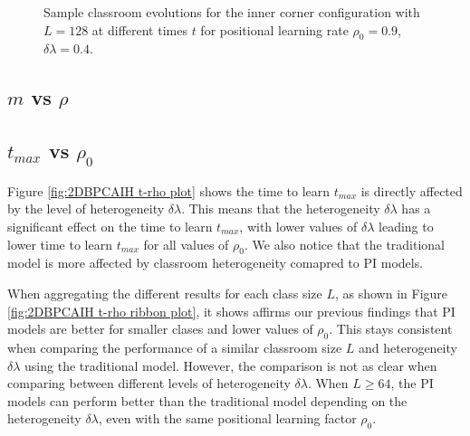\begin{figure}[htbp!]
    \label{fig:2DBPCAIH sample class evolution high rho high delta}
    \caption{Sample classroom evolutions for the inner corner configuration with $L=128$ at different times $t$ for positional learning rate $\rho_0=0.9$, $\delta\lambda = 0.4$.}
 \end{figure}

\subsection{$m$ vs $\rho$}\label{subsec:BPCAIH m vs rho}

\subsection{$t_{max}$ vs $\rho_0$}\label{subsec:BPCAIH t vs rho}
Figure \ref{fig:2DBPCAIH t-rho plot} shows the time to learn $t_{max}$ is directly affected by the level of heterogeneity $\delta\lambda$. 
This means that the heterogeneity $\delta\lambda$ has a significant effect on the time to learn $t_{max}$, with lower values of $\delta\lambda$ leading to lower time to learn $t_{max}$ for all values of $\rho_0$. 
We also notice that the traditional model is more affected by classroom heterogeneity comapred to PI models.

When aggregating the different results for each class size $L$, as shown in Figure \ref{fig:2DBPCAIH t-rho ribbon plot}, it shows affirms our previous findings that PI models are better for smaller clases and lower values of $\rho_0$.
This stays consistent when comparing the performance of a similar classroom size $L$ and heterogeneity $\delta\lambda$ using the traditional model.
However, the comparison is not as clear when comparing between different levels of heterogeneity $\delta\lambda$.
When $L\geq64$, the PI models can perform better than the traditional model depending on the heterogeneity $\delta\lambda$, even with the same positional learning factor $\rho_0$.

